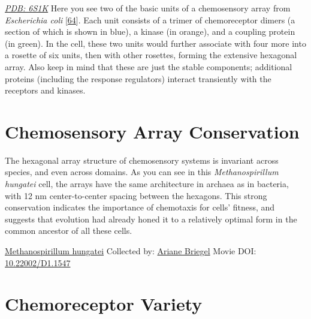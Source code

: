 \documentclass[]{tufte-book}
\begin{document}
\href{http://rcsb.org/structure/6S1K}{\emph{PDB: 6S1K}}
Here you see two of the basic units of a chemosensory array from \emph{Escherichia coli} {[}\protect\hyperlink{ref-cassidy2020}{64}{]}. Each unit consists of a trimer of chemoreceptor dimers (a section of which is shown in blue), a kinase (in orange), and a coupling protein (in green). In the cell, these two units would further associate with four more into a rosette of six units, then with other rosettes, forming the extensive hexagonal array. Also keep in mind that these are just the stable components; additional proteins (including the response regulators) interact transiently with the receptors and kinases.

\hypertarget{chemosensory-array-conservation}{%
\section{Chemosensory Array Conservation}\label{chemosensory-array-conservation}}

The hexagonal array structure of chemosensory systems is invariant across species, and even across domains. As you can see in this \emph{Methanospirillum hungatei} cell, the arrays have the same architecture in archaea as in bacteria, with 12 nm center-to-center spacing between the hexagons. This strong conservation indicates the importance of chemotaxis for cells' fitness, and suggests that evolution had already honed it to a relatively optimal form in the common ancestor of all these cells.



\hypertarget{htmlwidget-cbb8f5ca1c7f6e4dd994}{}

\label{fig:7-3}\protect\hyperlink{tree}{Methanospirillum hungatei} Collected by: \protect\hyperlink{ariane_briegel}{Ariane Briegel} Movie DOI: \href{https://doi.org/10.22002/D1.1547}{10.22002/D1.1547}

\hypertarget{chemoreceptor-variety}{%
\section{Chemoreceptor Variety}\label{chemoreceptor-variety}}
\end{document}
